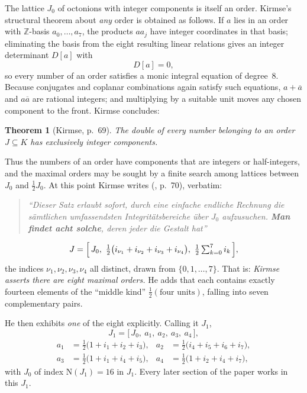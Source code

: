\documentclass[11pt]{amsart}
\newcommand{\ZZ}{\mathbb{Z}}
\newcommand{\Nm}{\mathrm{N}}
\newcommand{\cj}[1]{\overline{#1}}
\numberwithin{equation}{section}
\theoremstyle{definition}
\theoremstyle{plain}
\newtheorem{theorem}[definition]{Theorem}
\theoremstyle{remark}
\begin{document}
The lattice $J_0$ of octonions with integer components is itself an order.
Kirmse's structural theorem about \emph{any} order is obtained as follows.
If $a$ lies in an order with $\ZZ$-basis $a_0,\ldots,a_7$, the products
$a a_j$ have integer coordinates in that basis; eliminating the basis from
the eight resulting linear relations gives an integer determinant $D[a]$
with
\begin{equation}\label{eq:degree8}
  D[a] = 0,
\end{equation}
so every number of an order satisfies a monic integral equation of degree~8.
Because conjugates and coplanar combinations again satisfy such equations,
$a+\cj a$ and $a\cj a$ are rational integers; and multiplying by a suitable
unit moves any chosen component to the front.  Kirmse concludes:

\begin{theorem}[Kirmse, p.~69]\label{thm:doubles}
The double of every number belonging to an order $J\subseteq K$ has
exclusively integer components.
\end{theorem}

Thus the numbers of an order have components that are integers or
half-integers, and the maximal orders may be sought by a finite search among
lattices between $J_0$ and $\tfrac12 J_0$.  At this point Kirmse writes
(\cite{Kirmse1924}, p.~70), verbatim:

\begin{quote}\itshape
``Dieser Satz erlaubt sofort, durch eine einfache endliche Rechnung die
s\"amtlichen umfassendsten Integrit\"atsbereiche \"uber $J_0$ aufzusuchen.
\textnormal{\textbf{Man findet acht solche}}, deren jeder die Gestalt hat''
\end{quote}
\begin{equation}\label{eq:eight}
  J = \Bigl[\, J_0,\ \tfrac12\bigl(i_{\nu_1}+i_{\nu_2}+i_{\nu_3}+i_{\nu_4}\bigr),\
  \tfrac12\textstyle\sum_{k=0}^{7} i_k \,\Bigr],
\end{equation}
the indices $\nu_1,\nu_2,\nu_3,\nu_4$ all distinct, drawn from
$\{0,1,\ldots,7\}$.  That is: \emph{Kirmse asserts there are eight maximal
orders.}  He adds that each contains exactly fourteen elements of the
``middle kind'' $\tfrac12(\text{four units})$, falling into seven
complementary pairs.

He then exhibits \emph{one} of the eight explicitly.  Calling it $J_1$,
\begin{equation}\label{eq:J1}
  J_1 = \bigl[\, J_0,\ a_1,\ a_2,\ a_3,\ a_4 \,\bigr],
\end{equation}
\begin{equation}\label{eq:J1gens}
\begin{aligned}
  a_1 &= \tfrac12\bigl(1 + i_1 + i_2 + i_3\bigr), &
  a_2 &= \tfrac12\bigl(i_4 + i_5 + i_6 + i_7\bigr),\\
  a_3 &= \tfrac12\bigl(1 + i_1 + i_4 + i_5\bigr), &
  a_4 &= \tfrac12\bigl(1 + i_2 + i_4 + i_7\bigr),
\end{aligned}
\end{equation}
with $J_0$ of index $\Nm(J_1)=16$ in $J_1$.  Every later section of the
paper works in this $J_1$.
\end{document}
